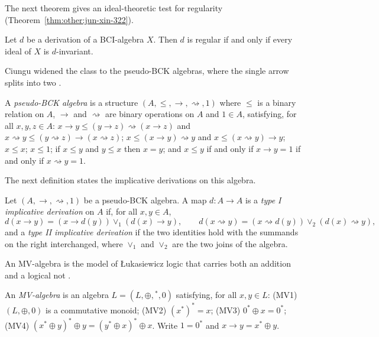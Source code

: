 The next theorem gives an ideal-theoretic test for regularity (Theorem~\ref{thm:other:jun-xin-322}).

\begin{theorem}\label{thm:other:jun-xin-322}
Let $d$ be a derivation of a BCI-algebra $X$. Then $d$ is regular if and
only if every ideal of $X$ is $d$-invariant.
\end{theorem}

Ciungu widened the class to the pseudo-BCK algebras, where the single
arrow splits into two
\cite[Definition~2.1, p.~177]{Ciungu2021}.

\begin{definition}\label{def:other:pseudo-bck}
A \emph{pseudo-BCK algebra} is a structure $(A, \le, \to, \rightsquigarrow, 1)$
where $\le$ is a binary relation on $A$, $\to$ and $\rightsquigarrow$ are
binary operations on $A$ and $1 \in A$, satisfying, for all $x, y, z \in A$:
$x \to y \le (y \to z) \rightsquigarrow (x \to z)$ and
$x \rightsquigarrow y \le (y \rightsquigarrow z) \to (x \rightsquigarrow z)$;
$x \le (x \to y) \rightsquigarrow y$ and
$x \le (x \rightsquigarrow y) \to y$; $x \le x$; $x \le 1$; if $x \le y$
and $y \le x$ then $x = y$; and $x \le y$ if and only if $x \to y = 1$ if
and only if $x \rightsquigarrow y = 1$.
\end{definition}

The next definition states the implicative derivations on this algebra.

\begin{definition}\label{def:other:implicative-derivation}
Let $(A, \to, \rightsquigarrow, 1)$ be a pseudo-BCK algebra. A map
$d \colon A \to A$ is a \emph{type I implicative derivation} on $A$ if,
for all $x, y \in A$,
\[
d(x \to y) = (x \to d(y)) \vee_1 (d(x) \to y),
\qquad
d(x \rightsquigarrow y) = (x \rightsquigarrow d(y)) \vee_2 (d(x) \rightsquigarrow y),
\]
and a \emph{type II implicative derivation} if the two identities hold
with the summands on the right interchanged, where $\vee_1$ and
$\vee_2$ are the two joins of the algebra.
\end{definition}

An MV-algebra is the model of Łukasiewicz logic that carries both an
addition and a logical not \cite[p.~261]{WangSheQian2019}.

\begin{definition}\label{def:other:mv-algebra}
An \emph{MV-algebra} is an algebra $L = (L, \oplus, {}^{*}, 0)$
satisfying, for all $x, y \in L$:
\textup{(MV1)} $(L, \oplus, 0)$ is a commutative monoid;
\textup{(MV2)} $(x^{*})^{*} = x$;
\textup{(MV3)} $0^{*} \oplus x = 0^{*}$;
\textup{(MV4)} $(x^{*} \oplus y)^{*} \oplus y = (y^{*} \oplus x)^{*} \oplus x$.
Write $1 = 0^{*}$ and $x \to y = x^{*} \oplus y$.
\end{definition}


